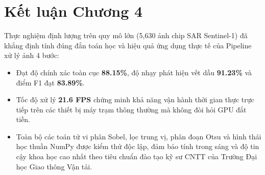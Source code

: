 \section{Kết luận Chương 4}
\label{sec:experiments_summary}
Thực nghiệm định lượng trên quy mô lớn (5,630 ảnh chip SAR Sentinel-1) đã khẳng định tính đúng đắn toán học và hiệu quả ứng dụng thực tế của Pipeline xử lý ảnh 4 bước:
\begin{itemize}
    \item Đạt độ chính xác toàn cục \textbf{88.15\%}, độ nhạy phát hiện vết dầu \textbf{91.23\%} và điểm F1 đạt \textbf{83.89\%}.
    \item Tốc độ xử lý \textbf{21.6 FPS} chứng minh khả năng vận hành thời gian thực trực tiếp trên các thiết bị máy trạm thông thường mà không đòi hỏi GPU đắt tiền.
    \item Toàn bộ các toán tử vi phân Sobel, lọc trung vị, phân đoạn Otsu và hình thái học thuần NumPy được kiểm thử độc lập, đảm bảo tính trong sáng và độ tin cậy khoa học cao nhất theo tiêu chuẩn đào tạo kỹ sư CNTT của Trường Đại học Giao thông Vận tải.
\end{itemize}
